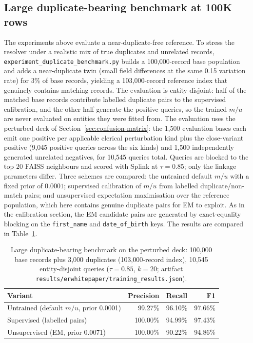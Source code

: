 \documentclass[11pt]{article}
\begin{document}
\subsection{Large duplicate-bearing benchmark at 100K rows}
The experiments above evaluate a near-duplicate-free reference. To stress the resolver under a realistic mix of true duplicates and unrelated records, \texttt{experiment\_duplicate\_benchmark.py} builds a 100{,}000-record base population and adds a near-duplicate twin (small field differences at the same 0.15 variation rate) for 3\% of base records, yielding a 103{,}000-record reference index that genuinely contains matching records. The evaluation is entity-disjoint: half of the matched base records contribute labelled duplicate pairs to the supervised calibration, and the other half generate the positive queries, so the trained $m/u$ are never evaluated on entities they were fitted from. The evaluation uses the perturbed deck of Section~\ref{sec:confusion-matrix}: the 1{,}500 evaluation bases each emit one positive per applicable clerical perturbation kind plus the close-variant positive (9{,}045 positive queries across the six kinds) and 1{,}500 independently generated unrelated negatives, for 10{,}545 queries total. Queries are blocked to the top 20 FAISS neighbours and scored with Splink at $\tau=0.85$; only the linkage parameters differ. Three schemes are compared: the untrained default $m/u$ with a fixed prior of $0.0001$; supervised calibration of $m/u$ from labelled duplicate/non-match pairs; and unsupervised expectation maximisation over the reference population, which here contains genuine duplicate pairs for EM to exploit. As in the calibration section, the EM candidate pairs are generated by exact-equality blocking on the \texttt{first\_name} and \texttt{date\_of\_birth} keys. The results are compared in Table~\ref{tab:100k-benchmark}.

\begin{table}[h]
\centering
\caption{Large duplicate-bearing benchmark on the perturbed deck: 100{,}000 base records plus 3{,}000 duplicates (103{,}000-record index), 10{,}545 entity-disjoint queries ($\tau=0.85$, $k=20$; artifact \texttt{results/erwhitepaper/training\_results.json}).}
\label{tab:100k-benchmark}
\begin{tabular}{lrrr}
\toprule
Variant & Precision & Recall & F1 \\
\midrule
Untrained (default $m/u$, prior 0.0001) & 99.27\% & 96.10\% & 97.66\% \\
Supervised (labelled pairs) & 100.00\% & 94.99\% & 97.43\% \\
Unsupervised (EM, prior 0.0071) & 100.00\% & 90.22\% & 94.86\% \\
\bottomrule
\end{tabular}
\end{table}
\end{document}

